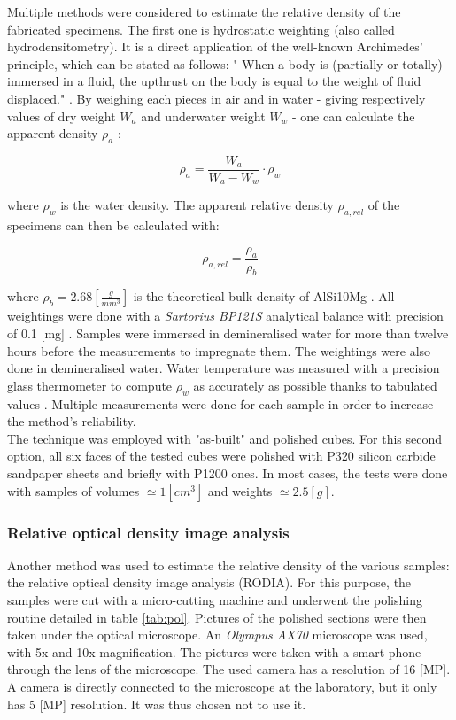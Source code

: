 Multiple methods were considered to estimate the relative density of the fabricated specimens. The first one is hydrostatic weighting (also called hydrodensitometry). It is a direct application of the well-known Archimedes' principle, which can be stated as follows: " When a body is (partially or totally) immersed in a fluid, the upthrust on the body is equal to the weight of fluid displaced." \parencite{ADictionaryofPhysics}. By weighing each pieces in air and in water - giving respectively values of dry weight $W_a$ and underwater weight $W_w$ - one can calculate the apparent density $\rho_a$ \parencite{MethArch}:

$$\rho_a=\frac{W_a}{W_a-W_w} \cdot \rho_w $$

where $\rho_w$ is the water density. The apparent relative density $\rho_{a,rel}$ of the specimens can then be calculated with:

$$\rho_{a,rel} = \frac{\rho_a}{\rho_b} $$

where $\rho_b = 2.68 [\frac{g}{mm^3}]$ is the theoretical bulk density of AlSi10Mg \parencite{Bulk}. All weightings were done with a \textit{Sartorius BP121S} analytical balance with precision of 0.1 [mg] \parencite{Balance}. Samples were immersed in demineralised water for more than twelve hours before the measurements to impregnate them. The weightings were also done in demineralised water. Water temperature was measured with a precision glass thermometer to compute $\rho_w$ as accurately as possible thanks to tabulated values \parencite{Eau}. Multiple measurements were done for each sample in order to increase the method's reliability. \\

The technique was employed with "as-built" and polished cubes. For this second option, all six faces of the tested cubes were polished with P320 silicon carbide sandpaper sheets and briefly with P1200 ones. In most cases, the tests were done with samples of volumes $\simeq 1 [cm^3]$ and weights $\simeq 2.5 [g]$.\\

\subsubsection{Relative optical density image analysis}

Another method was used to estimate the relative density of the various samples: the relative optical density image analysis (RODIA). For this purpose, the samples were cut with a micro-cutting machine and underwent the polishing routine detailed in table \ref{tab:pol}. Pictures of the polished sections were then taken under the optical microscope. An \textit{Olympus AX70} microscope was used, with 5x and 10x magnification. The pictures were taken with a smart-phone through the lens of the microscope. The used camera has a resolution of 16 [MP]. A camera is directly connected to the microscope at the laboratory, but it only has 5 [MP] resolution. It was thus chosen not to use it. \\

